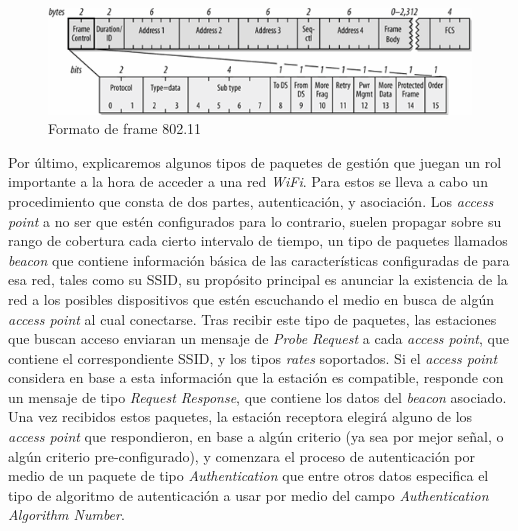 \documentclass[10pt,a4paper]{article}
\begin{document}
\begin{figure}[H]
\centerline{\includegraphics[scale=0.8]{images/8011_format_frame.png}}
\caption{Formato de frame 802.11}
\end{figure}

Por último, explicaremos algunos tipos de paquetes de gestión que juegan un rol importante a la hora de acceder a una red \textit{WiFi}. Para estos se lleva a cabo un procedimiento que consta de dos partes, autenticación, y asociación. Los \textit{access point} a no ser que estén configurados para lo contrario, suelen propagar sobre su rango de cobertura cada cierto intervalo de tiempo, un tipo de paquetes llamados \textit{beacon} que contiene información básica de las características configuradas de para esa red, tales como su SSID, su propósito principal es anunciar la existencia de la red a los posibles dispositivos que estén escuchando el medio en busca de algún \textit{access point} al cual conectarse. Tras recibir este tipo de paquetes, las estaciones que buscan acceso enviaran un mensaje de \textit{Probe Request} a cada \textit{access point}, que contiene el correspondiente SSID, y los tipos \textit{rates} soportados. Si el \textit{access point} considera en base a esta información que la estación es compatible, responde con un mensaje de tipo \textit{Request Response}, que contiene los datos del \textit{beacon} asociado. Una vez recibidos estos paquetes, la estación receptora elegirá alguno de los \textit{access point} que respondieron, en base a algún criterio (ya sea por mejor señal, o algún criterio pre-configurado), y comenzara el proceso de autenticación por medio de un paquete de tipo \textit{Authentication} que entre otros datos especifica el tipo de algoritmo de autenticación a usar por medio del campo \textit{Authentication Algorithm Number}. 
\end{document}
